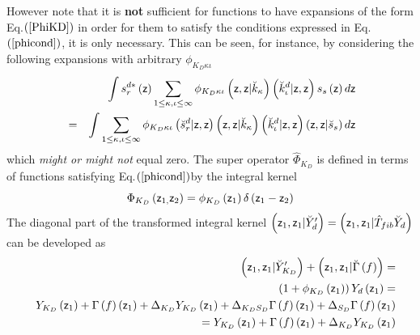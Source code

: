 However note that it is {\bf not }sufficient for functions to have
expansions of the form Eq.$\left( \ref{PhiKD}\right) $ in order for them to
satisfy the conditions expressed in Eq.$\left( \ref{phicond}\right) $, it is
only necessary. This can be seen, for instance, by considering the following
expansions with arbitrary $\phi _{K_{D}\kappa \iota }$ 
\begin{eqnarray}
&&\int s_{r}^{d\ast }\left( {\sf z}\right) \sum_{1\leq \kappa ,\iota \leq
\infty }\phi _{K_{D}\kappa \iota }\left( {\sf z},{\sf z}|\breve{k}_{\kappa
}\right) \left( \breve{k}_{\iota }^{d}|{\sf z},{\sf z}\right) s_{s}\left( 
{\sf z}\right) d{\sf z}  \nonumber \\
&=&\int \sum_{1\leq \kappa ,\iota \leq \infty }\phi _{K_{D}\kappa \iota
}\left( \breve{s}_{r}^{d}|{\sf z},{\sf z}\right) \left( {\sf z},{\sf z}|%
\breve{k}_{\kappa }\right) \left( \breve{k}_{\iota }^{d}|{\sf z},{\sf z}%
\right) \left( {\sf z},{\sf z}|\breve{s}_{s}\right) d{\sf z}
\end{eqnarray}%
which {\it might or might not} equal zero. The super operator $\hat{\Phi}%
_{K_{D}}$ is defined in terms of functions satisfying Eq.$\left( \ref%
{phicond}\right) $by the integral kernel 
\begin{equation}
\Phi _{K_{D}}\left( {\sf z}_{1,}{\sf z}_{2}\right) =\phi _{K_{D}}\left( {\sf %
z}_{1}\right) \delta \left( {\sf z}_{1}-{\sf z}_{2}\right)
\end{equation}%
The diagonal part of the transformed integral kernel $\left( {\sf z}_{1},%
{\sf z}_{1}|\breve{Y}_{d}^{\prime }\right) =\left( {\sf z}_{1},{\sf z}_{1}|%
\hat{T}_{fib}\breve{Y}_{d}\right) $ can be developed as 
\begin{eqnarray}
&&\left( {\sf z}_{1},{\sf z}_{1}|\breve{Y}_{K_{D}}^{\prime }\right) +\left( 
{\sf z}_{1},{\sf z}_{1}|\breve{\Gamma}\left( f\right) \right) =  \nonumber \\
&&\qquad \qquad \left( 1+\phi _{K_{D}}\left( {\sf z}_{1}\right) \right)
Y_{d}\left( {\sf z}_{1}\right) =  \nonumber \\
&&Y_{K_{D}}\left( {\sf z}_{1}\right) +\Gamma \left( f\right) \left( {\sf z}%
_{1}\right) +\Delta _{K_{D}}Y_{K_{D}}\left( {\sf z}_{1}\right) +\Delta
_{K_{D}S_{D}}\Gamma \left( f\right) \left( {\sf z}_{1}\right) +\Delta
_{S_{D}}\Gamma \left( f\right) \left( {\sf z}_{1}\right)  \nonumber \\
&&\qquad \qquad \qquad \qquad \qquad \qquad \quad =Y_{K_{D}}\left( {\sf z}%
_{1}\right) +\Gamma \left( f\right) \left( {\sf z}_{1}\right) +\Delta
_{K_{D}}Y_{K_{D}}\left( {\sf z}_{1}\right)  \label{diagexp}
\end{eqnarray}%
